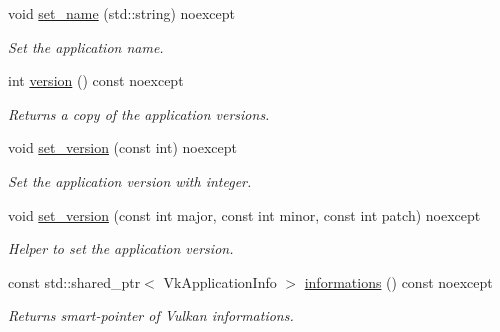 \begin{DoxyCompactItemize}
\hypertarget{classae_1_1_application_aa83e498302067740788c8e3bd9b95a62}{}\label{classae_1_1_application_aa83e498302067740788c8e3bd9b95a62} 
void \hyperlink{classae_1_1_application_aa83e498302067740788c8e3bd9b95a62}{set\+\_\+name} (std\+::string) noexcept
\begin{DoxyCompactList}\small\item\em Set the application name. \end{DoxyCompactList}\item 
\hypertarget{classae_1_1_application_a7b6d08a1968612f523e6f6c3b2c7786b}{}\label{classae_1_1_application_a7b6d08a1968612f523e6f6c3b2c7786b} 
int \hyperlink{classae_1_1_application_a7b6d08a1968612f523e6f6c3b2c7786b}{version} () const noexcept
\begin{DoxyCompactList}\small\item\em Returns a copy of the application versions. \end{DoxyCompactList}\item 
\hypertarget{classae_1_1_application_a7911bcd7ef75ee1bdce9d783b5d9577b}{}\label{classae_1_1_application_a7911bcd7ef75ee1bdce9d783b5d9577b} 
void \hyperlink{classae_1_1_application_a7911bcd7ef75ee1bdce9d783b5d9577b}{set\+\_\+version} (const int) noexcept
\begin{DoxyCompactList}\small\item\em Set the application version with integer. \end{DoxyCompactList}\item 
\hypertarget{classae_1_1_application_aa9c90bf2ce938a0861254f9ed656a68f}{}\label{classae_1_1_application_aa9c90bf2ce938a0861254f9ed656a68f} 
void \hyperlink{classae_1_1_application_aa9c90bf2ce938a0861254f9ed656a68f}{set\+\_\+version} (const int major, const int minor, const int patch) noexcept
\begin{DoxyCompactList}\small\item\em Helper to set the application version. \end{DoxyCompactList}\item 
\hypertarget{classae_1_1_application_a430877054b3f5cb743b3d8541a0a37e8}{}\label{classae_1_1_application_a430877054b3f5cb743b3d8541a0a37e8} 
const std\+::shared\+\_\+ptr$<$ Vk\+Application\+Info $>$ \hyperlink{classae_1_1_application_a430877054b3f5cb743b3d8541a0a37e8}{informations} () const noexcept
\begin{DoxyCompactList}\small\item\em Returns smart-\/pointer of Vulkan informations. \end{DoxyCompactList}\end{DoxyCompactItemize}
